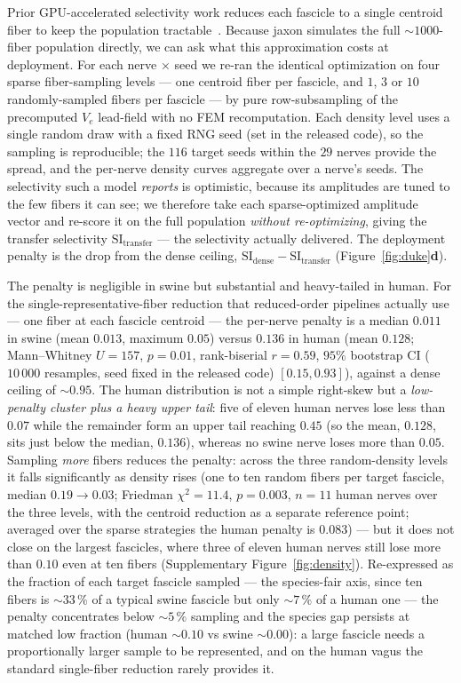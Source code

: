 Prior GPU-accelerated selectivity work reduces each fascicle to a
single centroid fiber to keep the population
tractable~\cite{hussain2024axonml}.  Because jaxon simulates the full
${\sim}1000$-fiber population directly, we can ask what this
approximation costs at deployment.  For each nerve $\times$ seed we
re-ran the identical optimization on four sparse fiber-sampling levels
--- one centroid fiber per fascicle, and $1$, $3$ or $10$
randomly-sampled fibers per fascicle --- by pure row-subsampling of the
precomputed $V_e$ lead-field with no FEM recomputation.  Each
density level uses a single random draw with a fixed RNG seed (set in
the released code), so the sampling is reproducible; the $116$ target
seeds within the $29$ nerves provide the spread, and the per-nerve
density curves aggregate over a nerve's seeds.  The
selectivity such a model \emph{reports} is optimistic, because its
amplitudes are tuned to the few fibers it can see; we therefore take
each sparse-optimized amplitude vector and re-score it on the full
population \emph{without re-optimizing}, giving the transfer
selectivity $\mathrm{SI_{transfer}}$ --- the selectivity actually
delivered.  The deployment penalty is the drop from the dense ceiling,
$\mathrm{SI_{dense}} - \mathrm{SI_{transfer}}$
(Figure~\ref{fig:duke}\textbf{d}).

The penalty is negligible in swine but substantial and heavy-tailed in
human.  For the single-representative-fiber reduction that reduced-order
pipelines actually use --- one fiber at each fascicle centroid --- the
per-nerve penalty is a median $0.011$ in swine (mean $0.013$, maximum
$0.05$) versus $0.136$ in human (mean $0.128$; Mann--Whitney
$U = 157$, $p = 0.01$, rank-biserial $r = 0.59$, $95\%$ bootstrap CI ($10\,000$ resamples, seed fixed in the released code)
$[0.15, 0.93]$), against a dense ceiling of ${\sim}0.95$.  The human
distribution is not a simple right-skew but a \emph{low-penalty cluster
plus a heavy upper tail}: five of eleven human nerves lose less than
$0.07$ while the remainder form an upper tail reaching $0.45$ (so the
mean, $0.128$, sits just below the median, $0.136$), whereas no swine
nerve loses more than $0.05$.  Sampling \emph{more} fibers reduces the
penalty: across the three random-density levels it falls significantly
as density rises (one to ten random fibers per target fascicle, median
$0.19 \rightarrow 0.03$; Friedman $\chi^2 = 11.4$, $p = 0.003$, $n = 11$
human nerves over the three levels, with the centroid reduction as a
separate reference point; averaged over the sparse strategies the
human penalty is $0.083$) --- but it does not close on the largest fascicles, where three
of eleven human nerves still lose more than $0.10$ even at ten fibers
(Supplementary Figure~\ref{fig:density}).  Re-expressed
as the fraction of each target fascicle sampled --- the species-fair
axis, since ten fibers is ${\sim}33\,\%$ of a typical swine fascicle but
only ${\sim}7\,\%$ of a human one --- the penalty concentrates below
${\sim}5\,\%$ sampling and the species gap persists at matched low
fraction (human ${\sim}0.10$ vs swine ${\sim}0.00$): a large fascicle
needs a proportionally larger sample to be represented, and on the human
vagus the standard single-fiber reduction rarely provides it.

